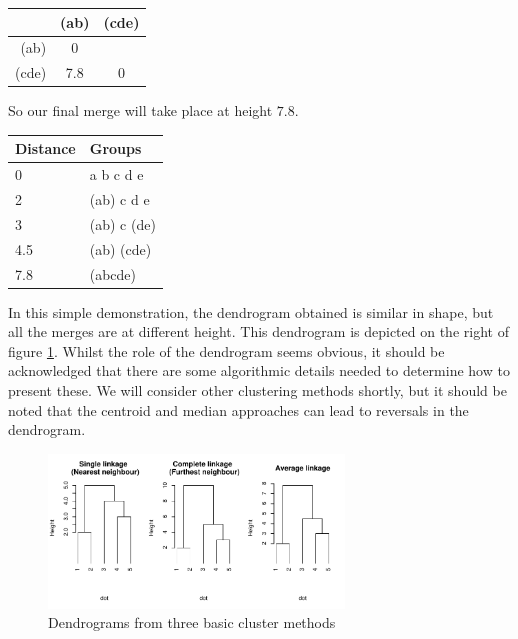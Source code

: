 \begin{minipage}[c]{0.5\textwidth}
\begin{tabular}{r|cc}
 & (ab) & (cde)\\
\hline
(ab)  & 0   &     \\
(cde) & 7.8 &  0  \\
\end{tabular}
\end{minipage}
\begin{minipage}[c]{0.5\textwidth}
So our final merge will take place at height $7.8$.

\begin{tabular}{ll}
Distance & Groups\\
\hline
0 & a b c d e\\
2 & (ab) c d e\\
3 & (ab) c (de)\\
4.5 & (ab) (cde)\\
7.8 & (abcde)
\end{tabular}
\end{minipage}

In this simple demonstration, the dendrogram obtained is similar in shape, but all the merges are at different height.   This dendrogram is depicted on the right of figure \ref{simpleclust}.   Whilst the role of the dendrogram seems obvious, it should be acknowledged that there are some algorithmic details needed to determine how to present these.   We will consider other clustering methods shortly, but it should be noted that the centroid and median approaches can lead to reversals in the dendrogram.

\begin{figure}
\begin{center}
\includegraphics[width = 0.7\textwidth]{images/democlust}
\caption{Dendrograms from three basic cluster methods}
\label{simpleclust}
\end{center}
\end{figure}


